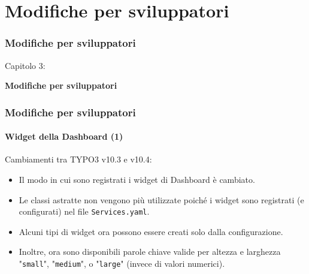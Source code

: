 %

\section{Modifiche per sviluppatori}
\begin{frame}[fragile]
	\frametitle{Modifiche per sviluppatori}

	\begin{center}\huge{Capitolo 3:}\end{center}
	\begin{center}\huge{\color{typo3darkgrey}\textbf{Modifiche per sviluppatori}}\end{center}

\end{frame}


\begin{frame}[fragile]
	\frametitle{Modifiche per sviluppatori}
	\framesubtitle{Widget della Dashboard (1)}

	Cambiamenti tra TYPO3 v10.3 e v10.4:

	\begin{itemize}
		\item Il modo in cui sono registrati i widget di Dashboard è cambiato.
		\item Le classi astratte non vengono più utilizzate poiché i widget sono registrati
			(e configurati) nel file \texttt{Services.yaml}.
		\item Alcuni tipi di widget ora possono essere creati solo dalla configurazione.
		\item Inoltre, ora sono disponibili parole chiave valide per altezza e larghezza
			"\texttt{small}", "\texttt{medium}", o "\texttt{large}"
			(invece di valori numerici).
	\end{itemize}

\end{frame}


